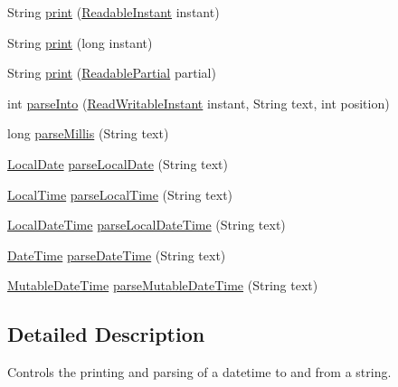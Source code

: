 \begin{DoxyCompactItemize}
\item 
String \hyperlink{classorg_1_1joda_1_1time_1_1format_1_1_date_time_formatter_a52fbd75c25fb89ae364d616219779635}{print} (\hyperlink{interfaceorg_1_1joda_1_1time_1_1_readable_instant}{Readable\-Instant} instant)
\item 
String \hyperlink{classorg_1_1joda_1_1time_1_1format_1_1_date_time_formatter_ae18d6f705fee34121164d93e0804bda1}{print} (long instant)
\item 
String \hyperlink{classorg_1_1joda_1_1time_1_1format_1_1_date_time_formatter_aee1d3798324c91e64ee1a7b28144664d}{print} (\hyperlink{interfaceorg_1_1joda_1_1time_1_1_readable_partial}{Readable\-Partial} partial)
\item 
int \hyperlink{classorg_1_1joda_1_1time_1_1format_1_1_date_time_formatter_a32515873759272911d8b1b2b07e671d1}{parse\-Into} (\hyperlink{interfaceorg_1_1joda_1_1time_1_1_read_writable_instant}{Read\-Writable\-Instant} instant, String text, int position)
\item 
long \hyperlink{classorg_1_1joda_1_1time_1_1format_1_1_date_time_formatter_aa93677513e0dca15a40bb68c75068920}{parse\-Millis} (String text)
\item 
\hyperlink{classorg_1_1joda_1_1time_1_1_local_date}{Local\-Date} \hyperlink{classorg_1_1joda_1_1time_1_1format_1_1_date_time_formatter_a569f2e4a370fd9cc69b394e6a03a81cf}{parse\-Local\-Date} (String text)
\item 
\hyperlink{classorg_1_1joda_1_1time_1_1_local_time}{Local\-Time} \hyperlink{classorg_1_1joda_1_1time_1_1format_1_1_date_time_formatter_a0d5ca04e0993c84898168eca8cefd05e}{parse\-Local\-Time} (String text)
\item 
\hyperlink{classorg_1_1joda_1_1time_1_1_local_date_time}{Local\-Date\-Time} \hyperlink{classorg_1_1joda_1_1time_1_1format_1_1_date_time_formatter_a396fe69de440c2c1f1a26c9ddcde8db7}{parse\-Local\-Date\-Time} (String text)
\item 
\hyperlink{classorg_1_1joda_1_1time_1_1_date_time}{Date\-Time} \hyperlink{classorg_1_1joda_1_1time_1_1format_1_1_date_time_formatter_a94220d7ba53ac1a3bf29832569579e97}{parse\-Date\-Time} (String text)
\item 
\hyperlink{classorg_1_1joda_1_1time_1_1_mutable_date_time}{Mutable\-Date\-Time} \hyperlink{classorg_1_1joda_1_1time_1_1format_1_1_date_time_formatter_af6fc5952f680e9b8b06d8949db4f1a95}{parse\-Mutable\-Date\-Time} (String text)
\end{DoxyCompactItemize}


\subsection{Detailed Description}
Controls the printing and parsing of a datetime to and from a string. 

